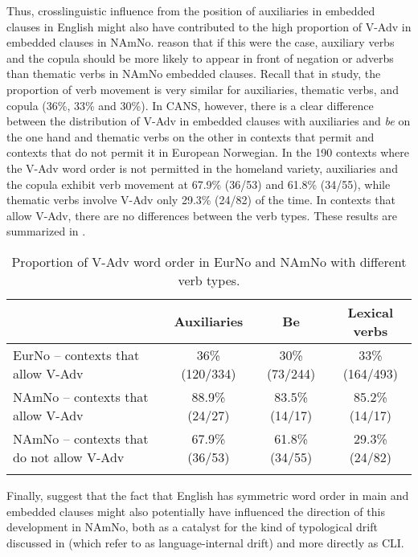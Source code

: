 \documentclass[output=paper]{langscibook}
\begin{document}
Thus, crosslinguistic influence from the position of auxiliaries in embedded clauses in English might also have contributed to the high proportion of V-Adv in embedded clauses in NAmNo. \citet{JensbergEtAl2024} reason that if this were the case, auxiliary verbs and the copula should be more likely to appear in front of negation or adverbs than thematic verbs in NAmNo embedded clauses. Recall that in  study, the proportion of verb movement is very similar for auxiliaries, thematic verbs, and copula (36\%, 33\% and 30\%). In CANS, however, there is a clear difference between the distribution of V-Adv in embedded clauses with auxiliaries and \textit{be} on the one hand and thematic verbs on the other in contexts that permit and contexts that do not permit it in European Norwegian. In the 190 contexts where the V-Adv word order is not permitted in the homeland variety, auxiliaries and the copula exhibit verb movement at 67.9\% (36/53) and 61.8\% (34/55), while thematic verbs involve V-Adv only 29.3\% (24/82) of the time. In contexts that allow V-Adv, there are no differences between the verb types. These results are summarized in .

\begin{table}
\begin{tabularx}{\textwidth}{Qccc}
\lsptoprule
 & Auxiliaries & Be & Lexical verbs\\\midrule
EurNo – contexts that allow V-Adv \citep{Ringstad2019} & 36\% (120/334) & 30\% (73/244) & 33\% (164/493)\\\addlinespace
NAmNo – contexts that allow V-Adv & 88.9\% (24/27) & 83.5\% (14/17) & 85.2\% (14/17)\\\addlinespace
NAmNo – contexts that do not allow V-Adv & 67.9\% (36/53) & 61.8\% (34/55) & 29.3\% (24/82)\\
\lspbottomrule
\end{tabularx}
\caption{\label{tab:anderssen:1}Proportion of V-Adv word order in EurNo and NAmNo with different verb types.}
\end{table}

Finally, \citet{JensbergEtAl2024} suggest that the fact that English has symmetric word order in main and embedded clauses might also potentially have influenced the direction of this development in NAmNo, both as a catalyst for the kind of typological drift discussed in \citet{HoppPutnam2015} (which \citeauthor{JensbergEtAl2024} refer to as language\hyp internal drift) and more directly as CLI.
\end{document}
